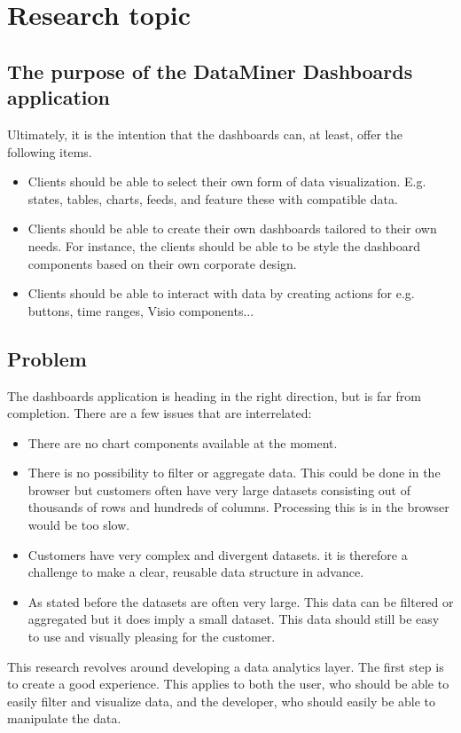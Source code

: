 \chapter{Research topic}

\section{The purpose of the DataMiner Dashboards application}


Ultimately, it is the intention that the dashboards can, at least, offer the following items. 

\begin{itemize}

    \item{Clients should be able to select their own form of data visualization. E.g. states, tables, charts, feeds, and feature these with compatible data.}
    \item{Clients should be able to create their own dashboards tailored to their own needs. For instance, the clients should be able to be style the dashboard components based on their own corporate design.}
    \item{Clients should be able to interact with data by creating actions for e.g. buttons, time ranges, Visio components...}
\end{itemize}

\section{Problem}
The dashboards application is heading in the right direction, but is far from completion. There are a few issues that are interrelated: 

\begin{itemize}
    \item{There are no chart components available at the moment.}
    \item{There is no possibility to filter or aggregate data. This could be done in the browser but customers often have very large datasets consisting out of thousands of rows and hundreds of columns. Processing this is in the browser would be too slow.}
    \item{Customers have very complex and divergent datasets. it is therefore a challenge to make a clear, reusable data structure in advance.}
    \item{As stated before the datasets are often very large. This data can be filtered or aggregated but it does imply a small dataset. This data should still be easy to use and visually pleasing for the customer.}
\end{itemize}

This research revolves around developing a data analytics layer. The first step is to create a good experience. This applies to both the user, who should be able to easily filter and visualize data, and the developer, who should easily be able to manipulate the data.
